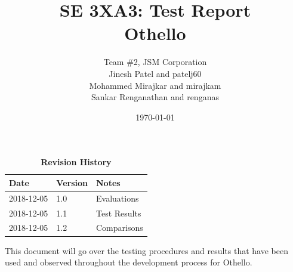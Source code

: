 \documentclass[12pt, titlepage]{article}
\title{SE 3XA3: Test Report\\Othello}
\author{Team \#2, JSM Corporation
		\\ Jinesh Patel and patelj60
		\\ Mohammed Mirajkar  and mirajkam
		\\ Sankar Renganathan and renganas
}
\date{\today}
\begin{document}
\maketitle

\tableofcontents
\listoftables
\listoffigures

\begin{table}[bp]
	\caption{\bf Revision History}
	\begin{tabularx}{\textwidth}{p{3cm}p{2cm}X}
		\toprule {\bf Date} & {\bf Version} & {\bf Notes}  \\
		\midrule
		2018-12-05          & 1.0           & Evaluations  \\
		2018-12-05          & 1.1           & Test Results \\
		2018-12-05          & 1.2           & Comparisons  \\
		\bottomrule
	\end{tabularx}
\end{table}

\newpage


This document will go over the testing procedures and results that have been used and observed throughout the development process for Othello.
\end{document}
